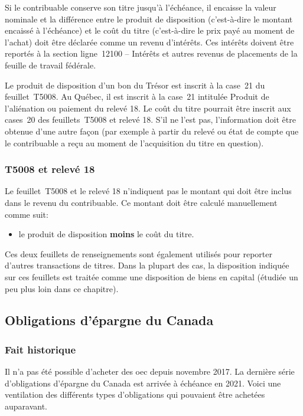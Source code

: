 Si le contribuable conserve son titre jusqu'à l'échéance, il encaisse la valeur nominale et la différence entre le produit de disposition (c'est-à-dire le montant encaissé à l'échéance) et le coût du titre (c'est-à-dire le prix payé au moment de l'achat) doit être déclarée comme un revenu d'intérêts. Ces intérêts doivent être reportés à la section ligne~12100 – Intérêts et autres revenus de placements de la feuille de travail fédérale.

Le produit de disposition d'un bon du Trésor est inscrit à la case~21 du feuillet~T5008. Au Québec, il est inscrit à la case~21 intitulée \og Produit de l'aliénation ou paiement \fg{} du relevé 18. Le coût du titre pourrait être inscrit aux cases~20 des feuillets~T5008 et relevé 18. S'il ne l'est pas, l'information doit être obtenue d'une autre façon (par exemple à partir du relevé ou état de compte que le contribuable a reçu au moment de l'acquisition du titre en question).


\subsubsection{T5008 et relevé 18}
Le feuillet~T5008 et le relevé 18 n'indiquent pas le montant qui doit être inclus dans le revenu du contribuable. Ce montant doit être calculé manuellement comme suit: 
\begin{itemize}
	\item le produit de disposition \textbf{moins} le coût du titre.
\end{itemize}

\begin{note}
	Ces deux feuillets de renseignements sont également utilisés pour reporter d'autres transactions de titres. Dans la plupart des cas, la disposition indiquée sur ces feuillets est traitée comme une disposition de biens en capital (étudiée un peu plus loin dans ce chapitre).
\end{note}


\subsection{Obligations d'épargne du Canada}
\subsubsection{Fait historique}
Il n'a pas été possible d'acheter des \acrfull{oec} depuis novembre 2017. La dernière série d'obligations d'épargne du Canada est arrivée à échéance en 2021. Voici une ventilation des différents types d'obligations qui pouvaient être achetées auparavant. 

